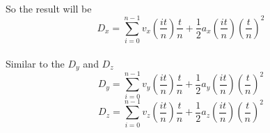 \paragraph{}
So the result will be
$$D_x = \sum_{i=0}^{n-1}{v_x(\frac{it}{n})\frac{t}{n}+\frac{1}{2}a_x(\frac{it}{n})(\frac{t}{n})^2}$$
\paragraph{}
Similar to the $D_y$ and $D_z$
$$D_y = \sum_{i=0}^{n-1}{v_y(\frac{it}{n})\frac{t}{n}+\frac{1}{2}a_y(\frac{it}{n})(\frac{t}{n})^2}$$
$$D_z = \sum_{i=0}^{n-1}{v_z(\frac{it}{n})\frac{t}{n}+\frac{1}{2}a_z(\frac{it}{n})(\frac{t}{n})^2}$$
